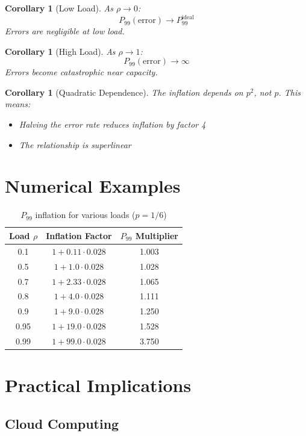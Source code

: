 \documentclass[11pt]{article}
\newtheorem{corollary}[theorem]{Corollary}
\begin{document}
\begin{corollary}[Low Load]
As $\rho \to 0$:
$$P_{99}(\text{error}) \to P_{99}^{\text{ideal}}$$
Errors are negligible at low load.
\end{corollary}

\begin{corollary}[High Load]
As $\rho \to 1$:
$$P_{99}(\text{error}) \to \infty$$
Errors become catastrophic near capacity.
\end{corollary}

\begin{corollary}[Quadratic Dependence]
The inflation depends on $p^2$, not $p$. This means:
\begin{itemize}
    \item Halving the error rate reduces inflation by factor 4
    \item The relationship is superlinear
\end{itemize}
\end{corollary}

\section{Numerical Examples}

\begin{table}[h]
\centering
\caption{$P_{99}$ inflation for various loads ($p = 1/6$)}
\begin{tabular}{ccc}
\toprule
Load $\rho$ & Inflation Factor & $P_{99}$ Multiplier \\
\midrule
0.1 & $1 + 0.11 \cdot 0.028$ & 1.003 \\
0.5 & $1 + 1.0 \cdot 0.028$ & 1.028 \\
0.7 & $1 + 2.33 \cdot 0.028$ & 1.065 \\
0.8 & $1 + 4.0 \cdot 0.028$ & 1.111 \\
0.9 & $1 + 9.0 \cdot 0.028$ & 1.250 \\
0.95 & $1 + 19.0 \cdot 0.028$ & 1.528 \\
0.99 & $1 + 99.0 \cdot 0.028$ & 3.750 \\
\bottomrule
\end{tabular}
\end{table}

\section{Practical Implications}

\subsection{Cloud Computing}
\end{document}
